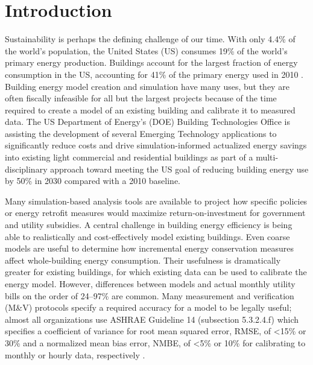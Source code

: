 \documentclass[preprint, review, 12pt]{elsarticle}
\begin{document}
\section{Introduction}
\label{sec:introduction}
Sustainability is perhaps the defining challenge of our time. With only 4.4\% of the world's population, the United States (US) consumes 19\% of the world's primary energy production. Buildings account for the largest fraction of energy consumption in the US, accounting for 41\% of the primary energy used in 2010 \cite{cit:doe2012a}. Building energy model creation and simulation have many uses, but they are often fiscally infeasible for all but the largest projects because of the time required to create a model of an existing building and calibrate it to measured data. The US Department of Energy's (DOE) Building Technologies Office is assisting the development of several Emerging Technology applications to significantly reduce costs and drive simulation-informed actualized energy savings into existing light commercial and residential buildings as part of a multi-disciplinary approach toward meeting the US goal of reducing building energy use by 50\% in 2030 compared with a 2010 baseline.

Many simulation-based analysis tools are available \cite{cit:doetools2012} to project how specific policies or energy retrofit measures \cite{Chidiac20115037} would maximize return-on-investment for government and utility subsidies. %
A central challenge in building energy efficiency is being able to realistically and cost-effectively model existing buildings. Even coarse models are useful to determine how incremental energy conservation measures affect whole-building energy consumption. Their usefulness is dramatically greater for existing buildings, for which existing data can be used to calibrate the energy model. However, differences between models and actual monthly utility bills on the order of 24--97\% \cite{cit:earthadvantage2009,cit:roberts2012} are common. Many measurement and verification (M\&V) protocols specify a required accuracy for a model to be legally useful; almost all organizations use ASHRAE Guideline 14 (subsection 5.3.2.4.f) which specifies a coefficient of variance for root mean squared error, RMSE, of \textless 15\% or 30\% and a normalized mean bias error, NMBE, of \textless 5\% or 10\% for calibrating to monthly or hourly data, respectively \cite{cit:ashrae2002}.
\end{document}
